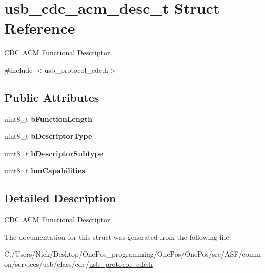 \hypertarget{structusb__cdc__acm__desc__t}{\section{usb\-\_\-cdc\-\_\-acm\-\_\-desc\-\_\-t Struct Reference}
\label{structusb__cdc__acm__desc__t}
}


C\-D\-C A\-C\-M Functional Descriptor.  




{\ttfamily \#include $<$usb\-\_\-protocol\-\_\-cdc.\-h$>$}

\subsection*{Public Attributes}
\begin{DoxyCompactItemize}
\item 
\hypertarget{structusb__cdc__acm__desc__t_ae803c98292de979d7c7345fa92b80ad0}{uint8\-\_\-t {\bfseries b\-Function\-Length}}\label{structusb__cdc__acm__desc__t_ae803c98292de979d7c7345fa92b80ad0}

\item 
\hypertarget{structusb__cdc__acm__desc__t_ac3fc0045813e83d431d42ed0c6d8b374}{uint8\-\_\-t {\bfseries b\-Descriptor\-Type}}\label{structusb__cdc__acm__desc__t_ac3fc0045813e83d431d42ed0c6d8b374}

\item 
\hypertarget{structusb__cdc__acm__desc__t_a3c39791b6ae51bfa6730a6fc7094c04b}{uint8\-\_\-t {\bfseries b\-Descriptor\-Subtype}}\label{structusb__cdc__acm__desc__t_a3c39791b6ae51bfa6730a6fc7094c04b}

\item 
\hypertarget{structusb__cdc__acm__desc__t_af37f070f757a7ea8f48c879c1865f54f}{uint8\-\_\-t {\bfseries bm\-Capabilities}}\label{structusb__cdc__acm__desc__t_af37f070f757a7ea8f48c879c1865f54f}

\end{DoxyCompactItemize}


\subsection{Detailed Description}
C\-D\-C A\-C\-M Functional Descriptor. 

The documentation for this struct was generated from the following file\-:\begin{DoxyCompactItemize}
\item 
C\-:/\-Users/\-Nick/\-Desktop/\-One\-Pos\-\_\-programming/\-One\-Pos/\-One\-Pos/src/\-A\-S\-F/common/services/usb/class/cdc/\hyperlink{usb__protocol__cdc_8h}{usb\-\_\-protocol\-\_\-cdc.\-h}\end{DoxyCompactItemize}
